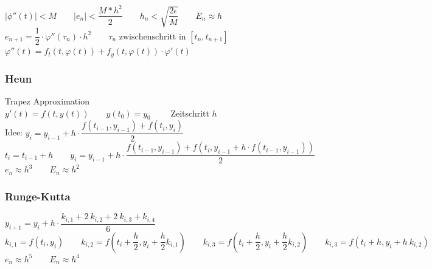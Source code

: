 $|\phi''(t)|<M \qquad |e_n| < \dfrac{M*h^2}{2} \qquad
h_n < \sqrt{\dfrac{2\epsilon}{M}} \qquad E_n \approx h$\\
$e_{n+1} = \dfrac{1}{2} \cdot \varphi''(\tau_n)\cdot h^2 \qquad \tau_n \text{ zwischenschritt in } [t_n,t_{n+1}]$\\
$\varphi''(t)=f_t(t,\varphi(t)) + f_y(t,\varphi(t))\cdot\varphi'(t)$

\subsubsection{Heun}
Trapez Approximation\\
$y'(t)=f(t,y(t)) \qquad y(t_0)=y_0 \qquad$ Zeitschritt $h$\\
Idee: $y_i=y_{i-1} + h \cdot \dfrac{f(t_{i-1},y_{i-1}) + f(t_{i},y_{i})}{2}$\\
$t_i = t_{i-1} + h \qquad 
y_i = y_{i-1} + h \cdot \dfrac{f(t_{i-1},y_{i-1}) + f(t_{i},y_{i-1} + h \cdot f(t_{i-1},y_{i-1}))}{2}$\\
$e_n \approx h^3 \qquad E_n \approx h^2$
\subsubsection{Runge-Kutta}
$y_{i+1}=y_i + h \cdot \dfrac{k_{i,1} + 2\:k_{i,2} + 2\:k_{i,3} + k_{i,4} }{6}$\\
$k_{i,1} = f(t_{i},y_{i}) \qquad 
k_{i,2} = f(t_{i} + \dfrac{h}{2},y_{i} + \dfrac{h}{2}k_{i,1}) \qquad 
k_{i,3} = f(t_{i} + \dfrac{h}{2},y_{i} + \dfrac{h}{2}k_{i,2}) \qquad 
k_{i,3} = f(t_{i} + h,y_{i} + h \: k_{i,2}) \qquad$\\
$e_n \approx h^5 \qquad E_n \approx h^4$
